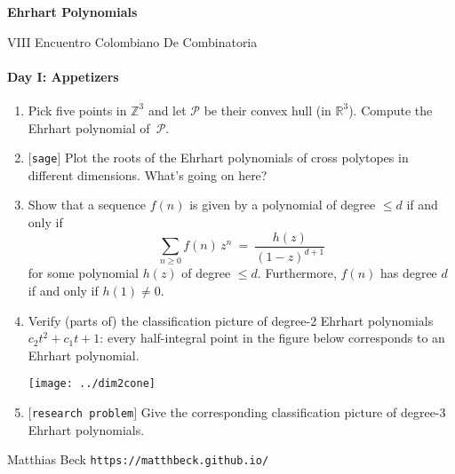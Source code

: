\documentclass[11pt]{article}
\def\cP{\mathcal{P}}
\def\RR{\mathbb{R}}
\def\ZZ{\mathbb{Z}}
\def\open{$[${\tt research problem}$]$ }
\def\sage{$[${\tt sage}$]$ }
\begin{document}
\setlength{\parindent}{0pt}
\setlength{\parskip}{0.4cm}

\pagestyle{empty}

\begin{center}
\Large{\bf Ehrhart Polynomials} 

\normalsize
VIII Encuentro Colombiano De Combinatoria
\end{center}

\paragraph{Day I: Appetizers}

\begin{enumerate}[(1)]
\vspace{-10pt}

\item Pick five points in $\ZZ^3$ and let $\cP$ be their convex hull (in $\RR^3$). Compute the Ehrhart polynomial of~$\cP$.

\item \sage Plot the roots of the Ehrhart polynomials of cross polytopes in
different dimensions. What's going on here?

\item Show that a sequence $f(n)$ is given by a polynomial of degree $\le d$ if and only if
    \[
        \sum_{ n \ge 0 } f(n) \, z^n \ = \ \frac{ h(z) }{ (1-z)^{ d+1 } }
    \]
    for some polynomial $h(z)$ of degree $\le d$.  Furthermore, $f(n)$ has
    degree $d$ if and only if $h(1) \ne 0$.

\item Verify (parts of) the classification picture of degree-2 Ehrhart polynomials $c_2 t^2 + c_1 t + 1$: every
half-integral point in the figure below corresponds to an Ehrhart polynomial.

\begin{center}
\texttt{[image: ../dim2cone]}
\end{center}

\item \open Give the corresponding classification picture of degree-3 Ehrhart polynomials. 
 
\end{enumerate}


{\sc Matthias Beck} \hfill {\tt https://matthbeck.github.io/}
\end{document}
